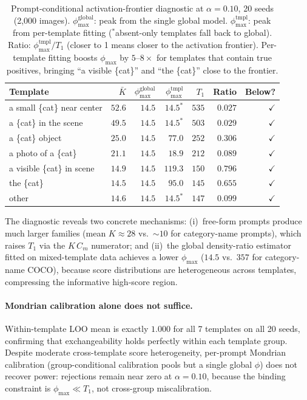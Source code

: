 \documentclass{article}
\theoremstyle{remark}
\newcommand{\1}{\mathbf{1}}
\begin{document}
\begin{table}[h]
\centering
\small
\begin{tabular*}{\linewidth}{@{\extracolsep{\fill}}lrrrrrr@{}}
\toprule
Template & $\bar{K}$ & $\phi_{\max}^{\text{global}}$ & $\phi_{\max}^{\text{tmpl}}$ & $T_1$ & Ratio & Below? \\
\midrule
a small \{cat\} near center & $52.6$ & $14.5$ & $14.5^{*}$ & $535$ & $0.027$ & $\checkmark$ \\
a \{cat\} in the scene      & $49.5$ & $14.5$ & $14.5^{*}$ & $503$ & $0.029$ & $\checkmark$ \\
a \{cat\} object             & $25.0$ & $14.5$ & $77.0$      & $252$ & $0.306$ & $\checkmark$ \\
a photo of a \{cat\}         & $21.1$ & $14.5$ & $18.9$      & $212$ & $0.089$ & $\checkmark$ \\
a visible \{cat\} in scene   & $14.9$ & $14.5$ & $\mathbf{119.3}$ & $150$ & $\mathbf{0.796}$ & $\checkmark$ \\
the \{cat\}                  & $14.5$ & $14.5$ & $\mathbf{95.0}$  & $145$ & $\mathbf{0.655}$ & $\checkmark$ \\
other                        & $14.6$ & $14.5$ & $14.5^{*}$ & $147$ & $0.099$ & $\checkmark$ \\
\bottomrule
\end{tabular*}
\caption{Prompt-conditional activation-frontier diagnostic at $\alpha=0.10$,
20 seeds (2{,}000 images).  $\phi_{\max}^{\text{global}}$: peak from the
single global model.  $\phi_{\max}^{\text{tmpl}}$: peak from per-template
fitting ($^{*}$absent-only templates fall back to global).  Ratio:
$\phi_{\max}^{\text{tmpl}}/T_1$ (closer to 1 means closer to the
activation frontier).  Per-template fitting boosts $\phi_{\max}$ by
$5$--$8\times$ for templates that contain true positives, bringing
``a visible \{cat\}'' and ``the \{cat\}'' close to the frontier.}
\label{tab:freeform_diagnostic}
\end{table}

The diagnostic reveals two concrete mechanisms: (i)~free-form prompts
produce much larger families (mean $K\!\approx\!28$ vs.\ ${\sim}10$ for
category-name prompts), which raises $T_1$ via the $K\,C_m$
numerator; and (ii)~the global density-ratio estimator fitted on
mixed-template data achieves a lower $\phi_{\max}$ ($14.5$ vs.\ $357$
for category-name COCO), because score distributions are heterogeneous
across templates, compressing the informative high-score region.

\paragraph{Mondrian calibration alone does not suffice.}
Within-template LOO mean is exactly $1.000$ for all 7 templates on all 20
seeds, confirming that exchangeability holds perfectly within each template
group.  Despite moderate cross-template score heterogeneity, per-prompt
Mondrian calibration (group-conditional calibration pools but a single
global $\phi$) does not recover power: rejections remain near zero at
$\alpha\!=\!0.10$, because the binding constraint is
$\phi_{\max}\!\ll\!T_1$, not cross-group miscalibration.
\end{document}
